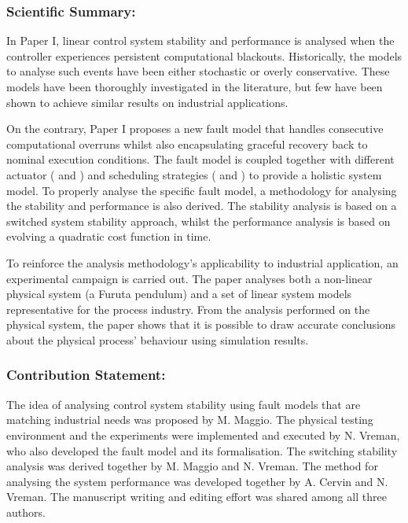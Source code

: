 \subsubsection*{Scientific Summary:}%
%
In Paper I, linear control system stability and performance is analysed when the controller experiences persistent computational blackouts.
Historically, the models to analyse such events have been either stochastic or overly conservative.
These models have been thoroughly investigated in the literature, but few have been shown to achieve similar results on industrial applications.

On the contrary, Paper I proposes a new fault model that handles consecutive computational overruns whilst also encapsulating graceful recovery back to nominal execution conditions.
The fault model is coupled together with different actuator (\tZ{} and \tH{}) and scheduling strategies (\tK{} and \tS{}) to provide a holistic system model.
To properly analyse the specific fault model, a methodology for analysing the stability and performance is also derived.
The stability analysis is based on a switched system stability approach, whilst the performance analysis is based on evolving a quadratic cost function in time.

To reinforce the analysis methodology's applicability to industrial application, an experimental campaign is carried out.
The paper analyses both a non-linear physical system (a Furuta pendulum) and a set of linear system models representative for the process industry.
From the analysis performed on the physical system, the paper shows that it is possible to draw accurate conclusions about the physical process' behaviour using simulation results.

\subsubsection*{Contribution Statement:}%
%
The idea of analysing control system stability using fault models that are matching industrial needs was proposed by M. Maggio.
The physical testing environment and the experiments were implemented and executed by N. Vreman, who also developed the fault model and its formalisation.
The switching stability analysis was derived together by M. Maggio and N. Vreman.
The method for analysing the system performance was developed together by A. Cervin and N. Vreman.
The manuscript writing and editing effort was shared among all three authors.


